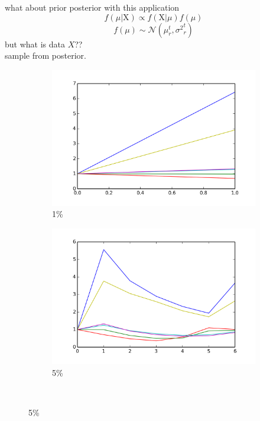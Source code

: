 \documentclass[12pt, a4paper, pdflatex, leqno]{report}
\begin{document}
what about prior posterior with this application\\
$$
f \left( \mu | \mathrm{X} \right) \propto f \left( \mathrm{X} | \mu \right) f \left( \mu \right)
$$
$$
f \left( \mu \right) \sim \mathcal{N} \left( \mu_r^t, {\sigma^2}_r^t \right)
$$
but what is data $X$??\\
sample from posterior.\\


\begin{figure}[ht]
  \begin{subfigure}{.5\linewidth}\centering
    \includegraphics[width=1.1\textwidth]{graphics/convergence01.png}
    \caption{1\%\label{fig:conv.ALL:01}}
  \end{subfigure}
  \begin{subfigure}{.5\linewidth}\centering
    \includegraphics[width=1.1\textwidth]{graphics/convergence05.png}
    \caption{5\%\label{fig:conv.ALL:05}}
  \end{subfigure}\\[1ex]


\end{figure}
\end{document}
